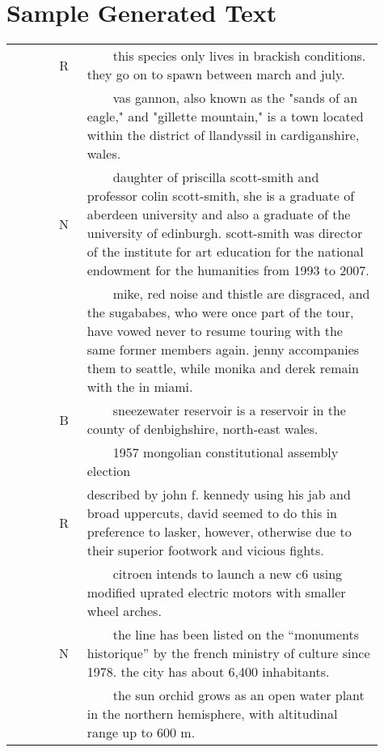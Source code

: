 \documentclass[11pt,a4paper]{article}
\newcommand{\tabitem}{~~\llap{\textbullet}~~}
\begin{document}
\newpage
\section{Sample Generated Text}\label{app:gen_text}



\begin{longtable}{ >{\footnotesize}p{0.11\linewidth}c>{\small}p{0.8\linewidth} }
 \toprule
 \multirow{6}{*}{\bf Transformer} &R& \tabitem this species only lives in brackish conditions. they go on to spawn between march and july.\\
&& \tabitem vas gannon, also known as the "sands of an eagle," and "gillette mountain," is a town located within the district of llandyssil in cardiganshire, wales.  \\\cline{2-3}
 &N &\tabitem daughter of priscilla scott-smith and professor colin scott-smith, she is a graduate of aberdeen university and also a graduate of the university of edinburgh. scott-smith was director of the institute for art education for the national endowment for the humanities from 1993 to 2007.\\
&& \tabitem  mike, red noise and thistle are disgraced, and the sugababes, who were once part of the tour, have vowed never to resume touring with the same former members again. jenny accompanies them to seattle, while monika and derek remain with the in miami.\\ \cline{2-3}
 &B& \tabitem sneezewater reservoir is a reservoir in the county of denbighshire, north-east wales. \\
&& \tabitem 1957 mongolian constitutional assembly election \\ 
 \toprule
 \multirow{6}{*}{\parbox{2cm}{\centering \bf Transformer {\footnotesize(AS)}}}  &R& described by john f. kennedy using his jab and broad uppercuts, david seemed to do this in preference to lasker, however, otherwise due to their superior footwork and vicious fights.  \\
&& \tabitem citroen intends to launch a new c6 using modified uprated electric motors with smaller wheel arches. \\\cline{2-3}
 &N & \tabitem the line has been listed on the ``monuments historique'' by the french ministry of culture since 1978.
the city has about 6,400 inhabitants. \\
&& \tabitem the sun orchid grows as an open water plant in the northern hemisphere, with altitudinal range up to 600 m.\\ \cline{2-3}

\end{longtable}
\end{document}
